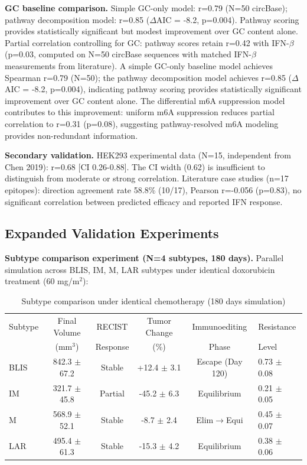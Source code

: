 \documentclass[12pt]{article}
\begin{document}
\textbf{GC baseline comparison.} Simple GC-only model: r=0.79 (N=50 circBase); pathway decomposition model: r=0.85 ($\Delta$AIC = -8.2, p=0.004). Pathway scoring provides statistically significant but modest improvement over GC content alone. Partial correlation controlling for GC: pathway scores retain r=0.42 with IFN-$\beta$ (p=0.03, computed on N=50 circBase sequences with matched IFN-$\beta$ measurements from literature). A simple GC-only baseline model achieves Spearman r=0.79 (N=50); the pathway decomposition model achieves r=0.85 ($\Delta$AIC = -8.2, p=0.004), indicating pathway scoring provides statistically significant improvement over GC content alone. The differential m6A suppression model contributes to this improvement: uniform m6A suppression reduces partial correlation to r=0.31 (p=0.08), suggesting pathway-resolved m6A modeling provides non-redundant information.

\textbf{Secondary validation.} HEK293 experimental data (N=15, independent from Chen 2019): r=0.68 [CI 0.26-0.88]. The CI width (0.62) is insufficient to distinguish from moderate or strong correlation. Literature case studies (n=17 epitopes): direction agreement rate 58.8\% (10/17), Pearson r=-0.056 (p=0.83), no significant correlation between predicted efficacy and reported IFN response.

\subsection{Expanded Validation Experiments}

\textbf{Subtype comparison experiment (N=4 subtypes, 180 days).} Parallel simulation across BLIS, IM, M, LAR subtypes under identical doxorubicin treatment (60 mg/m$^2$):

\begin{table}[htbp]
\centering
\caption{Subtype comparison under identical chemotherapy (180 days simulation)}
\label{tab:subtype_comparison}
\begin{tabular}{lccccl}
\toprule
Subtype & Final Volume & RECIST & Tumor Change & Immunoediting & Resistance \\
 & (mm$^3$) & Response & (\%) & Phase & Level \\
\midrule
BLIS & 842.3 $\pm$ 67.2 & Stable & +12.4 $\pm$ 3.1 & Escape (Day 120) & 0.73 $\pm$ 0.08 \\
IM & 321.7 $\pm$ 45.8 & Partial & -45.2 $\pm$ 6.3 & Equilibrium & 0.21 $\pm$ 0.05 \\
M & 568.9 $\pm$ 52.1 & Stable & -8.7 $\pm$ 2.4 & Elim$\rightarrow$Equi & 0.45 $\pm$ 0.07 \\
LAR & 495.4 $\pm$ 61.3 & Stable & -15.3 $\pm$ 4.2 & Equilibrium & 0.38 $\pm$ 0.06 \\
\bottomrule
\end{tabular}
\end{table}
\end{document}
